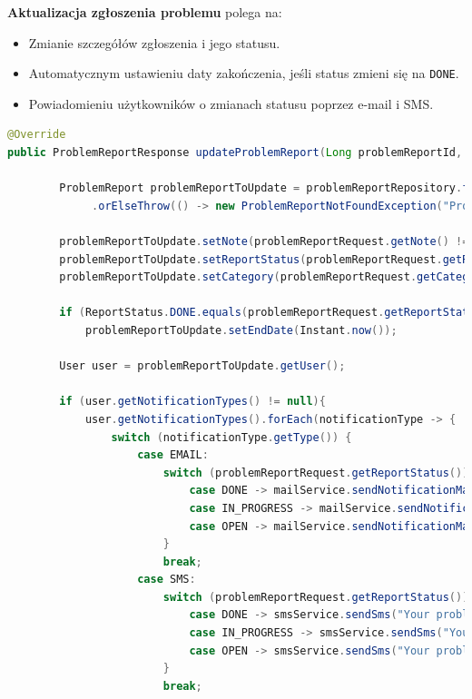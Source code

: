 \noindent \textbf{Aktualizacja zgłoszenia problemu} polega na:
\begin{itemize}
    \item Zmianie szczegółów zgłoszenia i jego statusu.
    \item Automatycznym ustawieniu daty zakończenia, jeśli status zmieni się na \texttt{DONE}.
    \item Powiadomieniu użytkowników o zmianach statusu poprzez e-mail i SMS.
\end{itemize}

\begin{lstlisting}[language=Java, style=JavaStyle, caption=Aktualizacja zgłoszenia problemu.]
@Override
public ProblemReportResponse updateProblemReport(Long problemReportId, ProblemReportRequest problemReportRequest) throws ProblemReportNotFoundException {

        ProblemReport problemReportToUpdate = problemReportRepository.findById(problemReportId)
             .orElseThrow(() -> new ProblemReportNotFoundException("Problem report not found with id: " + problemReportId));

        problemReportToUpdate.setNote(problemReportRequest.getNote() != null ? problemReportRequest.getNote() : problemReportToUpdate.getNote());
        problemReportToUpdate.setReportStatus(problemReportRequest.getReportStatus() != null ? problemReportRequest.getReportStatus() : problemReportToUpdate.getReportStatus());
        problemReportToUpdate.setCategory(problemReportRequest.getCategory() != null ? problemReportRequest.getCategory() : problemReportToUpdate.getCategory());

        if (ReportStatus.DONE.equals(problemReportRequest.getReportStatus()))
            problemReportToUpdate.setEndDate(Instant.now());

        User user = problemReportToUpdate.getUser();

        if (user.getNotificationTypes() != null){
            user.getNotificationTypes().forEach(notificationType -> {
                switch (notificationType.getType()) {
                    case EMAIL:
                        switch (problemReportRequest.getReportStatus()) {
                            case DONE -> mailService.sendNotificationMail("Problem report done", "Your problem report has been done", user.getEmail());
                            case IN_PROGRESS -> mailService.sendNotificationMail("Problem report in progress", "Your problem report is in progress", user.getEmail());
                            case OPEN -> mailService.sendNotificationMail("Problem report open", "Your problem report is open", user.getEmail());
                        }
                        break;
                    case SMS:
                        switch (problemReportRequest.getReportStatus()) {
                            case DONE -> smsService.sendSms("Your problem report has been done", user.getPhoneNumber());
                            case IN_PROGRESS -> smsService.sendSms("Your problem report is in progress", user.getPhoneNumber());
                            case OPEN -> smsService.sendSms("Your problem report is open", user.getPhoneNumber());
                        }
                        break;


\end{lstlisting}
